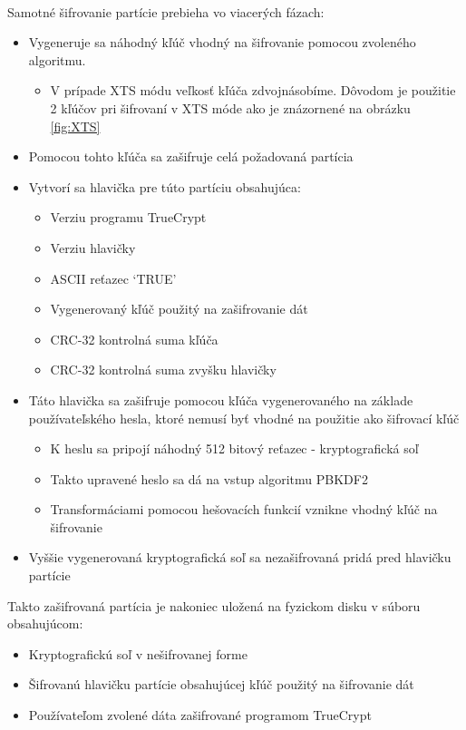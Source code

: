 \paragraph{}
Samotné šifrovanie partície prebieha vo viacerých fázach: 
\begin{itemize}
	\item Vygeneruje sa náhodný kľúč vhodný na šifrovanie pomocou zvoleného algoritmu. 
	\begin{itemize}
		\item V prípade XTS módu veľkosť kľúča zdvojnásobíme. Dôvodom je použitie 2 kľúčov pri šifrovaní v XTS móde ako je znázornené na obrázku \ref{fig:XTS}
	\end{itemize}
	\item Pomocou tohto kľúča sa zašifruje celá požadovaná partícia
	\item Vytvorí sa hlavička pre túto partíciu obsahujúca:
	\begin{itemize}
		\item Verziu programu TrueCrypt
		\item Verziu hlavičky
		\item ASCII reťazec `TRUE'
		\item Vygenerovaný kľúč použitý na zašifrovanie dát
		\item CRC-32 kontrolná suma kľúča
		\item CRC-32 kontrolná suma zvyšku hlavičky
	\end{itemize}
	\item Táto hlavička sa zašifruje pomocou kľúča vygenerovaného na základe používateľského hesla, ktoré nemusí byť vhodné na použitie ako šifrovací kľúč
	\begin{itemize}
		\item K heslu sa pripojí náhodný 512 bitový reťazec - kryptografická soľ
		\item Takto upravené heslo sa dá na vstup algoritmu PBKDF2
		\item Transformáciami pomocou hešovacích funkcií vznikne vhodný kľúč na šifrovanie
	\end{itemize}
	\item Vyššie vygenerovaná kryptografická soľ sa nezašifrovaná pridá pred hlavičku partície
\end{itemize}
Takto zašifrovaná partícia je nakoniec uložená na fyzickom disku v súboru obsahujúcom:
\begin{itemize}
	\item Kryptografickú soľ v nešifrovanej forme
	\item Šifrovanú hlavičku partície obsahujúcej kľúč použitý na šifrovanie dát
	\item Používateľom zvolené dáta zašifrované programom TrueCrypt
\end{itemize}

